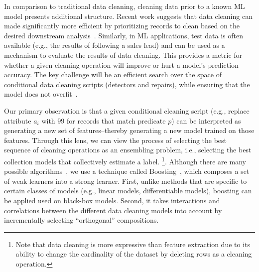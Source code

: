In comparison to traditional data cleaning, cleaning data prior to a known ML model presents additional structure.
Recent work suggests that data cleaning can made significantly more efficient by prioritizing records to clean based on the  desired downstream analysis~\cite{altwaijry2015query, DBLP:conf/sigmod/BergmanMNT15, DBLP:journals/pvldb/KrishnanWWFG16}.
Similarly, in ML applications, test data is often available (e.g., the results of following a sales lead) and can be used as a mechanism to evaluate the results of data cleaning.  
This provides a metric for whether a given cleaning operation will improve or hurt a model's prediction accuracy.
The key challenge will be an efficient search over the space of conditional data cleaning scripts (detectors and repairs), while ensuring that the model does not overfit~\cite{DBLP:journals/pvldb/KrishnanWWFG16,krishnan2016hilda}.  

Our primary observation is that a given conditional cleaning script (e.g., replace attribute $a_i$ with $99$ for records that match predicate $p$) can be interpreted as generating a new set of features--thereby generating a new model trained on those features. 
Through this lens, we  can view the process of selecting the best sequence of cleaning operations as an ensembling problem, i.e., selecting the best collection models that collectively estimate a label. \footnote{Note that data cleaning is more expressive than feature extraction due to its ability to change the cardinality of the dataset by deleting rows as a cleaning operation.}. 
Although there are many possible algorithms~\cite{dietterich2000ensemble}, we use a technique called Boosting~\cite{freund1995desicion}, which composes a set of weak learners into a strong learner.  
First, unlike methods that are specific to certain classes of models (e.g., linear models, differentiable models), boosting can be applied used on black-box models. 
Second, it takes interactions and correlations between the different data cleaning models into account by incrementally selecting ``orthogonal'' compositions.




